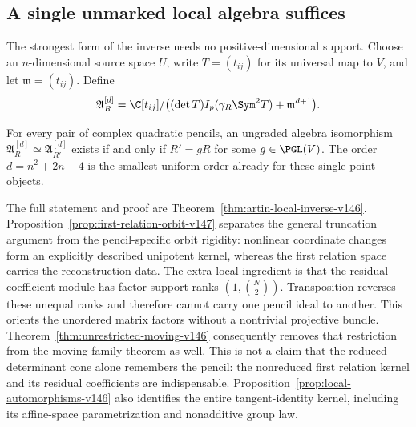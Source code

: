\subsection{A single unmarked local algebra suffices}
The strongest form of the inverse needs no positive-dimensional support.
Choose an \(n\)-dimensional source space \(U\), write \(T=(t_{ij})\)
for its universal map to \(V\), and let \(\mathfrak m=(t_{ij})\).
Define
\[
 \mathfrak A_R^{[d]}=
 \C[t_{ij}]/\bigl((\det T)I_p(\gamma_R\Sym^2T)
                                      +\mathfrak m^{d+1}\bigr).
\]
\begin{theorem}\label{thm:principal-local-v146}
For every pair of complex quadratic pencils, an ungraded algebra
isomorphism \(\mathfrak A_R^{[d]}\simeq\mathfrak A_{R'}^{[d]}\)
exists if and only if \(R'=gR\) for some \(g\in\PGL(V)\).
The order \(d=n^2+2n-4\) is the smallest uniform order already for
these single-point objects.
\end{theorem}
The full statement and proof are
Theorem~\ref{thm:artin-local-inverse-v146}.  Proposition~\ref{prop:first-relation-orbit-v147}
separates the general truncation argument from the pencil-specific
orbit rigidity: nonlinear coordinate changes form an explicitly described
unipotent kernel, whereas the first relation space carries the
reconstruction data.  The extra local ingredient
is that the residual coefficient module has factor-support ranks
\((1,\binom N2)\).  Transposition reverses these unequal ranks and
therefore cannot carry one pencil ideal to another.  This orients the
unordered matrix factors without a nontrivial projective bundle.
Theorem~\ref{thm:unrestricted-moving-v146} consequently removes that
restriction from the moving-family theorem as well.  This is not a
claim that the reduced determinant cone alone remembers the pencil:
the nonreduced first relation kernel and its residual coefficients
are indispensable.  Proposition~\ref{prop:local-automorphisms-v146}
also identifies the entire tangent-identity kernel, including its
affine-space parametrization and nonadditive group law.

